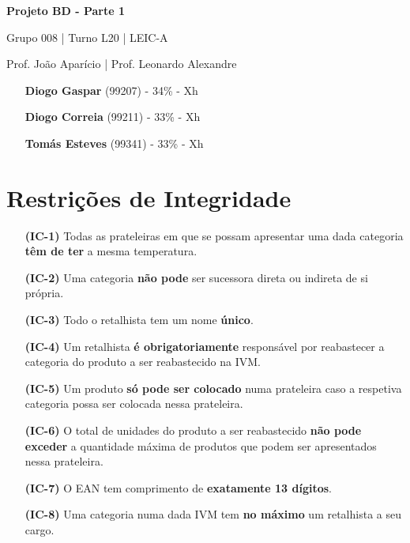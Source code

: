 \documentclass[12pt,a4paper]{article}
\begin{document}
  \begin{titlepage}
    \begin{center}
      \vspace*{5cm}
    
      \Huge
      \textbf{Projeto BD - Parte 1}

      \vspace{0.5cm}
      \LARGE
      Grupo 008 | Turno L20 | LEIC-A

      \vspace{0.5cm}
      \large
      Prof. João Aparício | Prof. Leonardo Alexandre

      \vfill
    \end{center}
    \large
    \begin{itemize}
      \item[] \textbf{Diogo Gaspar} (99207) - 34\% - Xh
      \item[] \textbf{Diogo Correia} (99211) - 33\% - Xh
      \item[] \textbf{Tomás Esteves} (99341) - 33\% - Xh
    \end{itemize}
  \end{titlepage}

  \begin{landscape}
    
  \end{landscape}

  \section*{Restrições de Integridade}
  \begin{itemize}
    \item[\textbf{(IC-1)}] Todas as prateleiras em que se possam apresentar uma dada categoria
      \textbf{têm de ter} a mesma temperatura.
		\item[\textbf{(IC-2)}] Uma categoria \textbf{não pode} ser sucessora direta
			ou indireta de si própria.
		\item[\textbf{(IC-3)}] Todo o retalhista tem um nome \textbf{único}.
		\item[\textbf{(IC-4)}] Um retalhista \textbf{é obrigatoriamente} responsável por
			reabastecer a categoria do produto a ser reabastecido na IVM.
		\item[\textbf{(IC-5)}] Um produto \textbf{só pode ser colocado} numa prateleira
			caso a respetiva categoria possa ser colocada nessa prateleira.
		\item[\textbf{(IC-6)}] O total de unidades do produto a ser reabastecido
			\textbf{não pode exceder} a quantidade máxima de produtos que podem ser apresentados nessa prateleira.
		\item[\textbf{(IC-7)}] O EAN tem comprimento de \textbf{exatamente 13 dígitos}.
		\item[\textbf{(IC-8)}] Uma categoria numa dada IVM tem \textbf{no máximo}
			um retalhista a seu cargo.
  \end{itemize}
\end{document}
